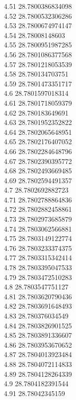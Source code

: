 {4.51	28.7800386834098\\
4.52	28.7800532306286\\
4.53	28.7800674974147\\
4.54	28.78008148603\\
4.55	28.7800951987285\\
4.56	28.7801086377568\\
4.57	28.7801218053539\\
4.58	28.780134703751\\
4.59	28.7801473351717\\
4.6	28.7801597018314\\
4.61	28.7801718059379\\
4.62	28.780183649691\\
4.63	28.7801952352822\\
4.64	28.7802065648951\\
4.65	28.7802176407052\\
4.66	28.7802284648796\\
4.67	28.7802390395772\\
4.68	28.7802493669485\\
4.69	28.7802594491357\\
4.7	28.7802692882723\\
4.71	28.7802788864836\\
4.72	28.7802882458861\\
4.73	28.7802973685879\\
4.74	28.7803062566881\\
4.75	28.7803149122774\\
4.76	28.7803233374375\\
4.77	28.7803315342414\\
4.78	28.7803395047533\\
4.79	28.7803472510283\\
4.8	28.7803547751127\\
4.81	28.7803620790436\\
4.82	28.7803691648493\\
4.83	28.780376034549\\
4.84	28.7803826901525\\
4.85	28.7803891336607\\
4.86	28.7803953670652\\
4.87	28.7804013923484\\
4.88	28.7804072114833\\
4.89	28.7804128264339\\
4.9	28.7804182391544\\
4.91	28.78042345159\\
}
